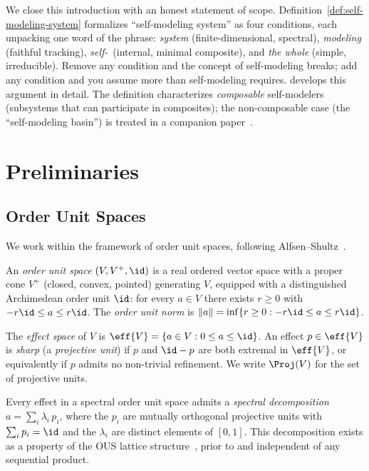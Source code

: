 \documentclass[11pt]{article}
\begin{document}
We close this introduction with an honest statement of scope.
Definition~\ref{def:self-modeling-system} formalizes ``self-modeling
system'' as four conditions, each unpacking one word of the phrase:
\emph{system} (finite-dimensional, spectral),
\emph{modeling} (faithful tracking),
\emph{self-}\ (internal, minimal composite), and
\emph{the whole} (simple, irreducible).
Remove any condition and the concept of self-modeling breaks; add
any condition and you assume more than self-modeling requires.
 develops this argument in detail.  The
definition characterizes \emph{composable} self-modelers (subsystems
that can participate in composites); the non-composable case (the
``self-modeling basin'') is treated in a companion paper~\cite{ehrlich2026sm}.


\section{Preliminaries}
\label{sec:prelim}


\subsection{Order Unit Spaces}
\label{sec:ous}

We work within the framework of order unit spaces, following
Alfsen--Shultz~\cite{AlfsenShultz2003}.

\begin{definition}\label{def:ous}
  An \emph{order unit space} $(V, V^{+}, \id)$ is a real ordered
  vector space with a proper cone $V^{+}$ (closed, convex, pointed)
  generating $V$, equipped with a distinguished Archimedean order unit
  $\id$: for every $a \in V$ there exists $r \geq 0$ with
  $-r\id \leq a \leq r\id$.  The \emph{order unit norm} is
  $\|a\| = \inf\{r \geq 0 : -r\id \leq a \leq r\id\}$.
\end{definition}

The \emph{effect space} of $V$ is
$\eff{V} = \{a \in V : 0 \leq a \leq \id\}$.  An effect
$p \in \eff{V}$ is \emph{sharp} (a \emph{projective unit}) if $p$ and
$\id - p$ are both extremal in $\eff{V}$, or equivalently if $p$
admits no non-trivial refinement.  We write $\Proj(V)$ for the set of
projective units.

Every effect in a spectral order unit space admits a \emph{spectral
decomposition} $a = \sum_{i} \lambda_{i}\, p_{i}$, where the $p_{i}$
are mutually orthogonal projective units with
$\sum_{i} p_{i} = \id$ and the $\lambda_{i}$ are distinct elements of
$[0,1]$.  This decomposition exists as a property of the OUS lattice
structure~\cite{AlfsenShultz2003}, prior to and independent of any
sequential product.
\end{document}
